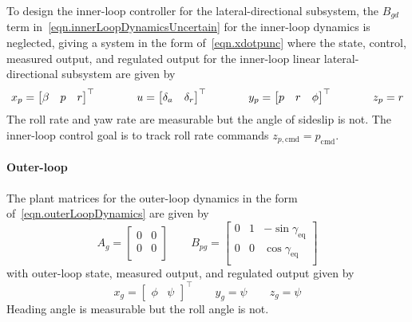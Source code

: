 To design the inner-loop controller for the lateral-directional subsystem, the $B_{gd}$ term in\ \eqref{eqn.innerLoopDynamicsUncertain} for the inner-loop dynamics is neglected, giving a system in the form of\ \eqref{eqn.xdotpunc} where the state, control, measured output, and regulated output for the inner-loop linear lateral-directional subsystem are given by
\begin{equation*}
  x_{p}=
  \begin{bmatrix}
    \beta & p & r
  \end{bmatrix}^{\top}
  \hspace{0.5in}
  u=
  \begin{bmatrix}
    \delta_{a} & \delta_{r}
  \end{bmatrix}^{\top}
  \hspace{0.5in}
  y_{p}=
  \begin{bmatrix}
    p & r & \phi
  \end{bmatrix}^{\top}
  \hspace{0.5in}
  z_{p} = r
\end{equation*}
The roll rate and yaw rate are measurable but the angle of sideslip is not.
The inner-loop control goal is to track roll rate commands $z_{p,\text{cmd}}=p_{\text{cmd}}$.

\paragraph{Outer-loop}

The plant matrices for the outer-loop dynamics in the form of\ \eqref{eqn.outerLoopDynamics} are given by
\begin{equation*}
  A_{g} =
  \begin{bmatrix}
    0 & 0 \\
    0 & 0 \\
  \end{bmatrix}
  \qquad
  B_{pg} =
  \begin{bmatrix}
    0 & 1 & -\sin\gamma_{\text{eq}} \\
    0 & 0 & \cos\gamma_{\text{eq}} \\
  \end{bmatrix}
\end{equation*}
with outer-loop state, measured output, and regulated output given by
\begin{equation*}
  x_{g} =
  \begin{bmatrix}
    \phi & \psi
  \end{bmatrix}^{\top}
  \qquad
  y_{g} = \psi
  \qquad
  z_{g} = \psi
\end{equation*}
Heading angle is measurable but the roll angle is not.

